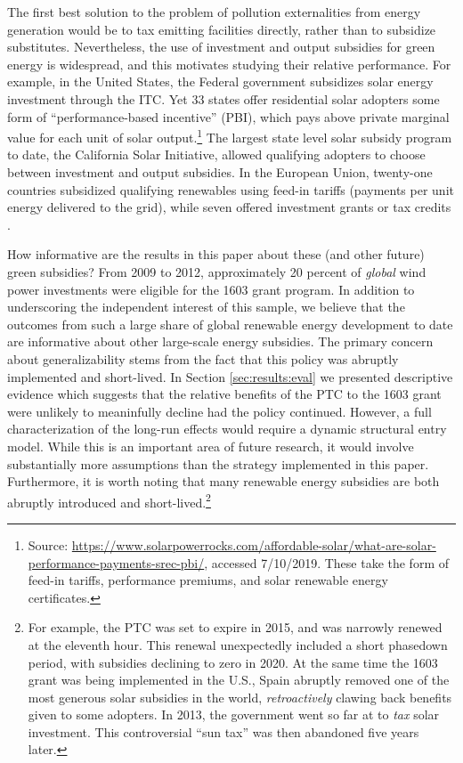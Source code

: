 \documentclass[12pt]{article}
\begin{document}
The first best solution to the problem of pollution externalities from energy generation would be to tax emitting facilities directly, rather than to subsidize substitutes. Nevertheless, the use of investment and output subsidies for green energy is widespread, and this motivates studying their relative performance. For example, in the United States, the Federal government subsidizes solar energy investment through the ITC. Yet 33 states offer residential solar adopters some form of ``performance-based incentive'' (PBI), which pays above private marginal value for each unit of solar output.\footnote{Source: \href{https://www.solarpowerrocks.com/affordable-solar/what-are-solar-performance-payments-srec-pbi/}{https://www.solarpowerrocks.com/affordable-solar/what-are-solar-performance-payments-srec-pbi/}, accessed 7/10/2019. These take the form of feed-in tariffs, performance premiums, and solar renewable energy certificates.} The largest state level solar subsidy program to date, the California Solar Initiative, allowed qualifying adopters to choose between investment and output subsidies. In the European Union, twenty-one countries subsidized qualifying renewables using feed-in tariffs (payments per unit energy delivered to the grid), while seven offered investment grants or tax credits \citep{JENNER2013385}.

How informative are the results in this paper about these (and other future) green subsidies? From 2009 to 2012, approximately 20 percent of \textit{global} wind power investments were eligible for the 1603 grant program. In addition to underscoring the independent interest of this sample, we believe that the outcomes from such a large share of global renewable energy development to date are informative about other large-scale energy subsidies. The primary concern about generalizability stems from the fact that this policy was abruptly implemented and short-lived. In Section \ref{sec:results:eval} we presented descriptive evidence which suggests that the relative benefits of the PTC to the 1603 grant were unlikely to meaninfully decline had the policy continued. However, a full characterization of the long-run effects would require a dynamic structural entry model. While this is an important area of future research, it would involve substantially more assumptions than the strategy implemented in this paper. Furthermore, it is worth noting that many renewable energy subsidies are both abruptly introduced and short-lived.\footnote{For example, the PTC was set to expire in 2015, and was narrowly renewed at the eleventh hour. This renewal unexpectedly included a short phasedown period, with subsidies declining to zero in 2020. At the same time the 1603 grant was being implemented in the U.S., Spain abruptly removed one of the most generous solar subsidies in the world, \textit{retroactively} clawing back benefits given to some adopters. In 2013, the government went so far at to \textit{tax} solar investment. This controversial ``sun tax'' was then abandoned  five years later.}
\end{document}
